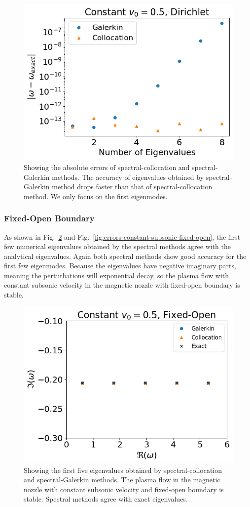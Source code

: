 \begin{figure}[htpb]
	\centering
	\includegraphics[width=0.7\linewidth]{figures/errors-constant-subsonic-dirichlet.png}
	\caption{Showing the absolute errors of spectral-collocation and spectral-Galerkin methods. The accuracy of eigenvalues obtained by spectral-Galerkin method drops faster than that of spectral-collocation method. We only focus on the first eigenmodes.}
	\label{fig:errors-constant-subsonic-dirichlet}
\end{figure}

\subsubsection*{Fixed-Open Boundary}
As shown in Fig.~\ref{fig:constant-subsonic-fixed-open} and Fig.~\ref{fig:errors-constant-subsonic-fixed-open}, the first few numerical eigenvalues obtained by the spectral methods agree with the analytical eigenvalues. Again both spectral methods show good accuracy for the first few eigenmodes. Because the eigenvalues have negative imaginary parts, meaning the perturbations will exponential decay, so the plasma flow with constant subsonic velocity in the magnetic nozzle with fixed-open boundary is stable.

\begin{figure}[htbp]
	\centering
	\includegraphics[width=0.7\linewidth]{figures/constant-subsonic-fixed-open.png}
	\caption{Showing the first five eigenvalues obtained by spectral-collocation and spectral-Galerkin methods. The plasma flow in the magnetic nozzle with constant subsonic velocity and fixed-open boundary is stable. Spectral methods agree with exact eigenvalues.}
	\label{fig:constant-subsonic-fixed-open}
\end{figure}

